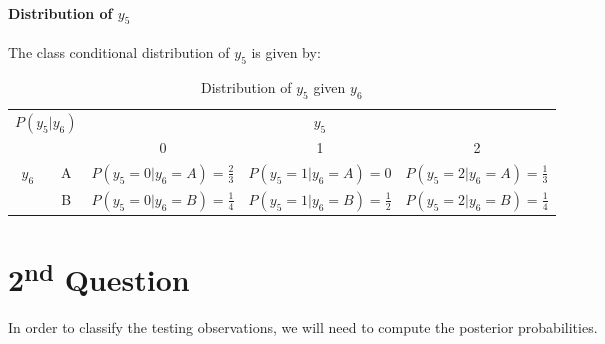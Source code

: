 \documentclass{article}
\begin{document}
\paragraph{Distribution of $y_5$}

The class conditional distribution of $y_5$ is given by:

\begin{table}[h!]
\centering
\begin{tabular}{|cc|ccc|}
\hline
\multicolumn{2}{|c|}{\multirow{2}{*}{$P(y_5|y_6)$}} & \multicolumn{3}{c|}{$y_5$}                                                                                                        \\ \cline{3-5} 
\multicolumn{2}{|c|}{}                              & \multicolumn{1}{c|}{0}                           & \multicolumn{1}{c|}{1}                           & 2                           \\ \hline
\multicolumn{1}{|c|}{\multirow{2}{*}{$y_6$}}   & A  & \multicolumn{1}{c|}{$P(y_5=0|y_6=A) =\frac{2}{3}$} & \multicolumn{1}{c|}{$P(y_5=1|y_6=A) =0$} & $P(y_5=2|y_6=A) =\frac{1}{3}$ \\ \cline{2-5} 
\multicolumn{1}{|c|}{}                         & B  & \multicolumn{1}{c|}{$P(y_5=0|y_6=B) =\frac{1}{4}$} & \multicolumn{1}{c|}{$P(y_5=1|y_6=B) =\frac{1}{2}$} & $P(y_5=2|y_6=B) =\frac{1}{4}$ \\ \hline
\end{tabular}
\caption{Distribution of $y_5$ given $y_6$}
\end{table}

\section*{2\textsuperscript{nd} Question}

In order to classify the testing observations, we will need to compute the posterior probabilities.
\end{document}
